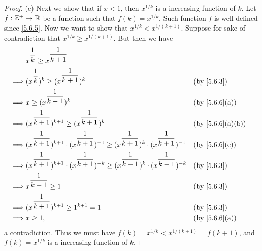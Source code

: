 \begin{proof}{(e)}
  Next we show that if \(x < 1\), then \(x^{1 / k}\) is a increasing function of \(k\).
  Let \(f : \mathbb{Z}^+ \to \mathbb{R}\) be a function such that \(f(k) = x^{1 / k}\).
  Such function \(f\) is well-defined since \cref{5.6.5}.
  Now we want to show that \(x^{1 / k} < x^{1 / (k + 1)}\).
  Suppose for sake of contradiction that \(x^{1 / k} \geq x^{1 / (k + 1)}\).
  But then we have
  \begin{align*}
             & x^{\dfrac{1}{k}} \geq x^{\dfrac{1}{k + 1}}                                                                                                                           \\
    \implies & (x^{\dfrac{1}{k}})^k \geq (x^{\dfrac{1}{k + 1}})^k                                                                               &  & \text{(by \cref{5.6.3})}       \\
    \implies & x \geq (x^{\dfrac{1}{k + 1}})^k                                                                                                  &  & \text{(by \cref{5.6.6}(a))}    \\
    \implies & (x^{\dfrac{1}{k + 1}})^{k + 1} \geq (x^{\dfrac{1}{k + 1}})^k                                                                     &  & \text{(by \cref{5.6.6}(a)(b))} \\
    \implies & (x^{\dfrac{1}{k + 1}})^{k + 1} \cdot (x^{\dfrac{1}{k + 1}})^{-1} \geq (x^{\dfrac{1}{k + 1}})^k \cdot (x^{\dfrac{1}{k + 1}})^{-1} &  & \text{(by \cref{5.6.6}(c))}    \\
    \implies & (x^{\dfrac{1}{k + 1}})^{k + 1} \cdot (x^{\dfrac{1}{k + 1}})^{-k} \geq (x^{\dfrac{1}{k + 1}})^k \cdot (x^{\dfrac{1}{k + 1}})^{-k} &  & \text{(by \cref{5.6.3})}       \\
    \implies & x^{\dfrac{1}{k + 1}} \geq 1                                                                                                      &  & \text{(by \cref{5.6.3})}       \\
    \implies & (x^{\dfrac{1}{k + 1}})^{k + 1} \geq 1^{k + 1} = 1                                                                                &  & \text{(by \cref{5.6.3})}       \\
    \implies & x \geq 1,                                                                                                                        &  & \text{(by \cref{5.6.6}(a))}
  \end{align*}
  a contradiction.
  Thus we must have \(f(k) = x^{1 / k} < x^{1 / (k + 1)} = f(k + 1)\), and \(f(k) = x^{1 / k}\) is a increasing function of \(k\).


\end{proof}
